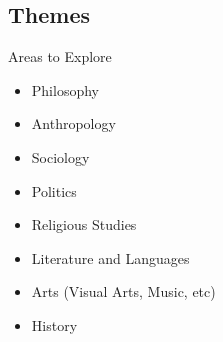 \subsection{Themes}
\begin{frame}{Areas to Explore}
	\begin{itemize}
		\item<1->Philosophy
		\item<2->Anthropology
		\item<2->Sociology
		\item<3->Politics
		\item<3->Religious Studies
		\item<4->Literature and Languages
		\item<4->Arts (Visual Arts, Music, etc)
		\item<5->History
	\end{itemize}
\end{frame}

\timeout